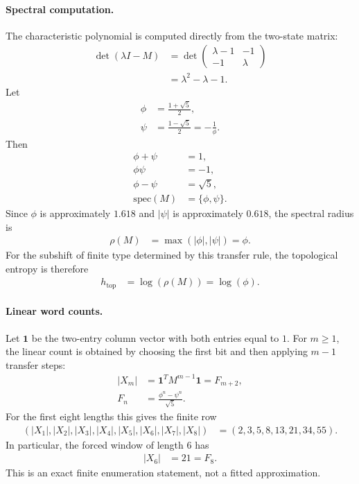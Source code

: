 \paragraph{Spectral computation.}
The characteristic polynomial is computed directly from the two-state matrix:
$$
\begin{aligned}
\det(\lambda I-M)&=\det\begin{pmatrix}\lambda-1&-1\\-1&\lambda\end{pmatrix}\\
&=\lambda^2-\lambda-1.
\end{aligned}
$$
Let
$$
\begin{aligned}
\phi&=\frac{1+\sqrt{5}}{2},\\
\psi&=\frac{1-\sqrt{5}}{2}=-\frac{1}{\phi}.
\end{aligned}
$$
Then
$$
\begin{aligned}
\phi+\psi&=1,\\
\phi\psi&=-1,\\
\phi-\psi&=\sqrt{5},\\
\mathrm{spec}(M)&=\{\phi,\psi\}.
\end{aligned}
$$
Since $\phi$ is approximately $1.618$ and $|\psi|$ is approximately $0.618$, the spectral radius is
$$
\begin{aligned}
\rho(M)&=\max(|\phi|,|\psi|)=\phi.
\end{aligned}
$$
For the subshift of finite type determined by this transfer rule, the topological entropy is therefore
$$
\begin{aligned}
h_{\mathrm{top}}&=\log(\rho(M))=\log(\phi).
\end{aligned}
$$

\paragraph{Linear word counts.}
Let $\mathbf{1}$ be the two-entry column vector with both entries equal to $1$. For $m\geq 1$, the linear count is obtained by choosing the first bit and then applying $m-1$ transfer steps:
$$
\begin{aligned}
|X_m|&=\mathbf{1}^{T}M^{m-1}\mathbf{1}=F_{m+2},\\
F_n&=\frac{\phi^n-\psi^n}{\sqrt{5}}.
\end{aligned}
$$
For the first eight lengths this gives the finite row
$$
\begin{aligned}
(|X_1|,|X_2|,|X_3|,|X_4|,|X_5|,|X_6|,|X_7|,|X_8|)&=(2,3,5,8,13,21,34,55).
\end{aligned}
$$
In particular, the forced window of length $6$ has
$$
\begin{aligned}
|X_6|&=21=F_8.
\end{aligned}
$$
This is an exact finite enumeration statement, not a fitted approximation.

